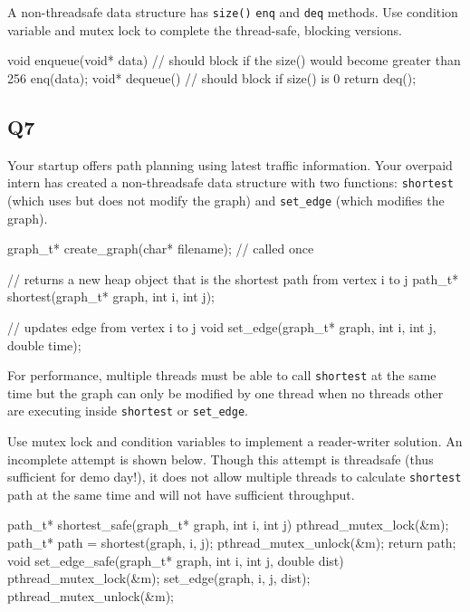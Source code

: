 A non-threadsafe data structure has \texttt{size()} \texttt{enq} and \texttt{deq} methods. Use condition variable and mutex lock to complete the thread-safe, blocking versions.

\begin{code}[language=C]
void enqueue(void* data) {
  // should block if the size() would become greater than 256
  enq(data);
}
void* dequeue() {
  // should block if size() is 0
  return deq();
}
\end{code}

\subsection{Q7}\label{q7}

Your startup offers path planning using latest traffic information. Your overpaid intern has created a non-threadsafe data structure with two functions: \texttt{shortest} (which uses but does not modify the graph) and \texttt{set\_edge} (which modifies the graph).

\begin{code}[language=C]
graph_t* create_graph(char* filename); // called once

// returns a new heap object that is the shortest path from vertex i to j
path_t* shortest(graph_t* graph, int i, int j); 

// updates edge from vertex i to j
void set_edge(graph_t* graph, int i, int j, double time); 
  
\end{code}

For performance, multiple threads must be able to call \texttt{shortest} at the same time but the graph can only be modified by one thread when no threads other are executing inside \texttt{shortest} or \texttt{set\_edge}.

Use mutex lock and condition variables to implement a reader-writer solution. An incomplete attempt is shown below. Though this attempt is threadsafe (thus sufficient for demo day!), it does not allow multiple threads to calculate \texttt{shortest} path at the same time and will not have sufficient throughput.

\begin{code}[language=C]
path_t* shortest_safe(graph_t* graph, int i, int j) {
  pthread_mutex_lock(&m);
  path_t* path = shortest(graph, i, j);
  pthread_mutex_unlock(&m);
  return path;
}
void set_edge_safe(graph_t* graph, int i, int j, double dist) {
  pthread_mutex_lock(&m);
  set_edge(graph, i, j, dist);
  pthread_mutex_unlock(&m);
}
\end{code}

